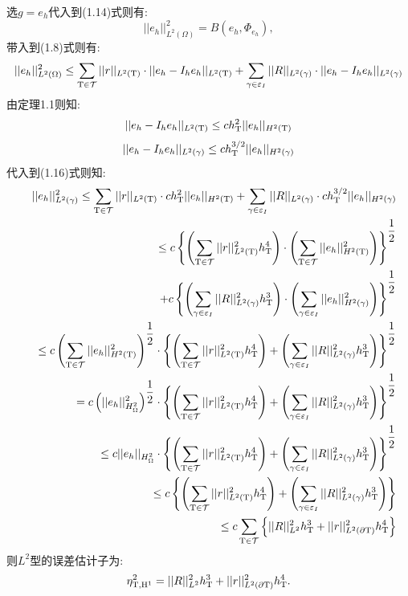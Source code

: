 \documentclass[9pt, a4paper,eqno]{article}
\theoremstyle{plain}
\begin{document}
\begin{CJK}{UTF8}{gkai}
选$g=e_h$代入到(1.14)式则有:$$||e_h||_{L^{2}(\Omega)}^{2}=B(e_h,\Phi_{e_h}),$$
带入到(1.8)式则有:
\begin{equation}
||e_h||_{L^{2}(\Omega)}^{2} \leq \sum_{ \rm T \in \mathcal{T} } || r|| _{L^{2}(\rm T)} \cdot || e_{h} - I_{h}e_{h} || _{L^{2}(\rm T)} + \sum_{ \gamma \in \varepsilon_{I} } || R|| _{L^{2}(\gamma)} \cdot || e_{h} - I_{h}e_{h} || _{L^{2}(\gamma)}
\end{equation}
由定理1.1则知:$$||e_h-I_h e_h||_{L^{2}(\rm T)} \leq ch_{\rm T}^{2}||e_h||_{H^{2}(\rm T)}$$
$$||e_h-I_h e_h||_{L^{2}(\gamma)} \leq ch^{3/2}_{\rm T} ||e_h||_{H^{2}(\gamma)}$$
代入到(1.16)式则知:
\begin{eqnarray}
&& ||e_h||_{L^{2}(\gamma)}^{2} \leq \sum_{ \rm T \in \mathcal{T} } || r|| _{L^{2}(\rm T)} \cdot ch_{\rm T}^{2}||e_h||_{H^{2}(\rm T)} + \sum_{ \gamma \in \varepsilon_{I} } || R|| _{L^{2}(\gamma)} \cdot ch^{3/2}_{\rm T} ||e_h||_{H^{2}(\gamma)}
\nonumber\\&& \leq c \left\lbrace \left( \sum_{\rm T \in \mathcal{T}} ||r||_{L^{2}(\rm T)}^{2} h_{\rm T}^{4}  \right) \cdot \left( \sum_{\rm T \in \mathcal{T}} ||e_h||_{H^{2}(\rm T)}^{2} \right)   \right\rbrace ^{\dfrac{1}{2}}
\nonumber\\&&   \hspace*{0.5cm} + c \left\lbrace \left( \sum_{\gamma \in \varepsilon_I} ||R||_{L^{2}(\gamma)}^{2} h_{\rm T}^{3}  \right) \cdot \left( \sum_{\gamma \in \varepsilon_I} ||e_h||_{H^{2}(\gamma)}^{2} \right)   \right\rbrace ^{\dfrac{1}{2}}
\nonumber\\&& \leq  c \left( \sum_{\rm T \in \mathcal{T}} ||e_h||_{H^{2}(\rm T)}^{2} \right)^{\dfrac{1}{2}} \cdot \left\lbrace \left( \sum_{\rm T \in \mathcal{T}} ||r||_{L^{2}(\rm T)}^{2} h^{4}_{\rm T}     \right)  +\left( \sum_{\gamma \in \varepsilon_{I}} ||R||_{L^{2}(\gamma)}^{2} h^{3}_{\rm T}     \right)   \right\rbrace^{\dfrac{1}{2}}
\nonumber\\&& =  c \left( ||e_h||_{H^{2}_{\Omega}}^{2}  \right)^{\dfrac{1}{2}} \cdot \left\lbrace \left( \sum_{\rm T \in \mathcal{T}} ||r||_{L^{2}(\rm T)}^{2} h^{4}_{\rm T}     \right)  +\left( \sum_{\gamma \in \varepsilon_{I}} ||R||_{L^{2}(\gamma)}^{2} h^{3}_{\rm T}     \right)   \right\rbrace^{\dfrac{1}{2}}
\nonumber\\&& \leq c  ||e_h||_{H^{2}_{\Omega}}  \cdot \left\lbrace \left( \sum_{\rm T \in \mathcal{T}} ||r||_{L^{2}(\rm T)}^{2} h^{4}_{\rm T}     \right)  +\left( \sum_{\gamma \in \varepsilon_{I}} ||R||_{L^{2}(\gamma)}^{2} h^{3}_{\rm T}     \right)   \right\rbrace^{\dfrac{1}{2}}
\nonumber\\&& \leq c \left\lbrace \left( \sum_{\rm T \in \mathcal{T}} ||r||_{L^{2}( \rm T)}^{2} h^{4}_{\rm T}     \right)  +\left( \sum_{\gamma \in \varepsilon_{I}} ||R||_{L^{2}(\gamma)}^{2} h^{3}_{\rm T}     \right) \right\rbrace 
\nonumber\\&& \leq c \sum_{\rm T \in \mathcal{T}} \left\lbrace  ||R||_{L^{2}}^{2} h_{\rm T}^{3} + ||r||_{L^{2}(\partial \rm T)}^{2} h_{\rm T}^{4}   \right\rbrace
\label{A1anotherboun}
\end{eqnarray}
则$L^{2}$型的误差估计子为:$$\eta _{\rm T,H^{1}}^{2} = ||R||_{L^{2}}^{2} h_{\rm T}^{3} + ||r||_{L^{2}(\partial \rm T)}^{2} h_{\rm T}^{4}.  $$


\end{CJK}
\end{document}

